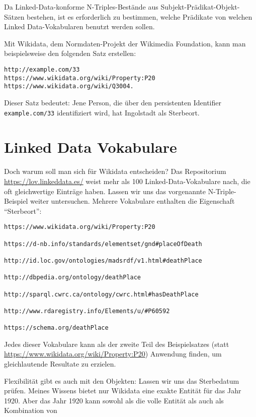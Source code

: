 \documentclass[a4paper,
fontsize=11pt,
oneside,
numbers=noperiodatend,
parskip=half-,
bibliography=totoc,
final
]{scrartcl}
\begin{document}
Da Linked-Data-konforme N-Triples-Bestände aus
Subjekt-Prädikat-Objekt-Sätzen bestehen, ist es erforderlich zu
bestimmen, welche Prädikate von welchen Linked Data-Vokabularen benutzt
werden sollen.

Mit Wikidata, dem Normdaten-Projekt der Wikimedia Foundation, kann man
beispielsweise den folgenden Satz erstellen:

\begin{verbatim}
http://example.com/33
https://www.wikidata.org/wiki/Property:P20
https://www.wikidata.org/wiki/Q3004.
\end{verbatim}

Dieser Satz bedeutet: Jene Person, die über den persistenten Identifier
\texttt{example.com/33} identifiziert wird, hat Ingolstadt als
Sterbeort.

\hypertarget{linked-data-vokabulare}{%
\section{Linked Data Vokabulare}\label{linked-data-vokabulare}}

Doch warum soll man sich für Wikidata entscheiden? Das Repositorium
\url{https://lov.linkeddata.es/} weist mehr als 100
Linked-Data-Vokabulare nach, die oft gleichwertige Einträge haben.
Lassen wir uns das vorgenannte N-Triple-Beispiel weiter untersuchen.
Mehrere Vokabulare enthalten die Eigenschaft \enquote{Sterbeort}:

\begin{verbatim}
https://www.wikidata.org/wiki/Property:P20

https://d-nb.info/standards/elementset/gnd#placeOfDeath

http://id.loc.gov/ontologies/madsrdf/v1.html#deathPlace

http://dbpedia.org/ontology/deathPlace

http://sparql.cwrc.ca/ontology/cwrc.html#hasDeathPlace

http://www.rdaregistry.info/Elements/u/#P60592

https://schema.org/deathPlace
\end{verbatim}

Jedes dieser Vokabulare kann als der zweite Teil des Beispielsatzes
(statt \url{https://www.wikidata.org/wiki/Property:P20}) Anwendung
finden, um gleichlautende Resultate zu erzielen.

Flexibilität gibt es auch mit den Objekten: Lassen wir uns das
Sterbedatum prüfen. Meines Wissens bietet nur Wikidata eine exakte
Entität für das Jahr 1920. Aber das Jahr 1920 kann sowohl als die volle
Entität als auch als Kombination von
\end{document}
